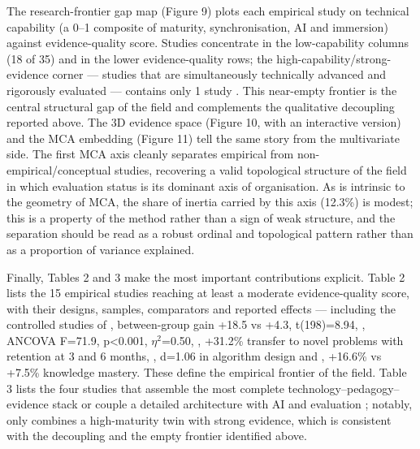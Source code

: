 The research-frontier gap map (Figure 9) plots each
empirical study on technical capability (a 0--1 composite of maturity,
synchronisation, AI and immersion) against evidence-quality score. Studies
concentrate in the low-capability columns (18 of 35) and in the lower
evidence-quality rows; the high-capability/strong-evidence corner --- studies that
are simultaneously technically advanced and rigorously evaluated --- contains only
1 study \cite{tarng_application_2024}. This near-empty frontier is the central structural gap of the field
and complements the qualitative decoupling reported above. The 3D evidence space
(Figure 10, with an interactive version) and the MCA embedding (Figure 11) tell
the same story from the multivariate side. The first MCA axis cleanly separates
empirical from non-empirical/conceptual studies, recovering a valid topological
structure of the field in which evaluation status is its dominant axis of
organisation. As is intrinsic to the geometry of MCA, the share of inertia carried
by this axis (12.3\%) is modest; this is a property of the method rather than a sign
of weak structure, and the separation should be read as a robust ordinal and
topological pattern rather than as a proportion of variance explained.

Finally, Tables 2 and 3 make the most important contributions explicit.
Table 2 lists the 15 empirical studies reaching at least a moderate
evidence-quality score, with their designs, samples, comparators and reported
effects --- including the controlled studies of \cite{kwateng_enhancing_2026}, between-group
gain +18.5 vs +4.3, t(198)=8.94, \cite{tarng_application_2024}, ANCOVA F=71.9, p\textless0.001,
\ensuremath{\eta^{2}}=0.50, \cite{lin_visfactory_2025}, +31.2\% transfer to novel problems with retention at
3 and 6 months, \cite{lu_digital_2025}, d=1.06 in algorithm design and
\cite{wang_innovative_2025}, +16.6\% vs +7.5\% knowledge mastery. These define the empirical frontier of
the field. Table 3 lists the four studies that assemble the most complete
technology--pedagogy--evidence stack \cite{sakkas_multiplayer_2025,tarng_application_2024,terkaj_framework_2024} or couple a detailed architecture with AI and evaluation
\cite{machado_automatic_2025}; notably, only \cite{tarng_application_2024} combines a high-maturity
twin with strong evidence, which is consistent with the decoupling and the empty
frontier identified above.

